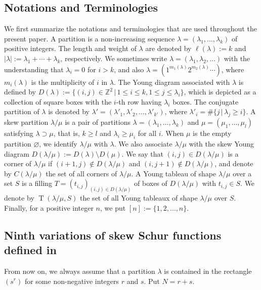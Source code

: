 \documentclass[12pt]{amsart}%
\theoremstyle{definition}
\DeclareMathOperator{\T}{T}
\begin{document}
\subsection{Notations and Terminologies}

We first summarize the notations and terminologies that are used throughout the present paper.
A partition is a non-increasing sequence $\lambda=(\lambda_1,\ldots,\lambda_k)$ of positive integers.
The length and weight of $\lambda$ are denoted by  $\ell(\lambda):=k$ and $|\lambda|:=\lambda_1+\cdots+\lambda_k$, respectively. 
We sometimes write $\lambda=(\lambda_1,\lambda_2,\ldots)$ with the understanding that $\lambda_i=0$ for $i>k$, and also $\lambda=(1^{m_1(\lambda)}2^{m_2(\lambda)}\cdots)$,
where $m_i(\lambda)$ is the multiplicity of $i$ in $\lambda$.
The Young diagram associated with $\lambda$ is defined by 
$D({\lambda}):=\{(i,j)\in {\mathbb{Z}}^2\,|\,1\leq i\leq k, 1\leq j\leq \lambda_i\}$, which is depicted as a collection of square boxes with the $i$-th row having $\lambda_i$ boxes.
The conjugate partition of $\lambda$ is denoted by 
$\lambda'=(\lambda'_1,\lambda'_2,\ldots,\lambda'_{k'})$,
where $\lambda'_i=\#\{j\,|\,\lambda_j\ge i\}$.
A skew partition $\lambda/\mu$ is a pair of partitions 
$\lambda=(\lambda_1,\ldots,\lambda_k)$ and 
$\mu=(\mu_1,\ldots,\mu_l)$ satisfying $\lambda\supset\mu$, that is, $k\ge l$ and $\lambda_i\geq \mu_i$ for all $i$. 
When $\mu$ is the empty partition $\varnothing$, 
we identify $\lambda/\mu$ with $\lambda$. 
We also associate $\lambda/\mu$ with the skew Young diagram $D({\lambda/\mu}):=D(\lambda)\setminus D(\mu)$.
We say that $(i,j)\in D({\lambda/\mu})$ is a corner of $\lambda/\mu$ if $(i+1, j)\notin D({\lambda/\mu})$ and $(i, j+1)\notin D({\lambda/\mu})$, 
and denote by $C({\lambda/\mu})$ the set of all corners of $\lambda/\mu$.
A Young tableau of shape $\lambda/\mu$ over a set $S$ is a filling $T=(t_{i,j})_{(i,j)\in D(\lambda/\mu)}$ of boxes of $D(\lambda/\mu)$ with $t_{i,j}\in S$.
We denote by $\T(\lambda/\mu,S)$ the set of all  Young tableaux of shape $\lambda/\mu$ over $S$. 
Finally, for a positive integer $n$, we put $[n]:=\{1,2,\ldots,n\}$.

\subsection{Ninth variations of skew Schur functions defined in \cite{nnsy}}

From now on, we always assume that a partition $\lambda$ is contained in the rectangle $(s^r)$ for some non-negative integers
$r$ and $s$. Put $N=r+s$.
\end{document}
